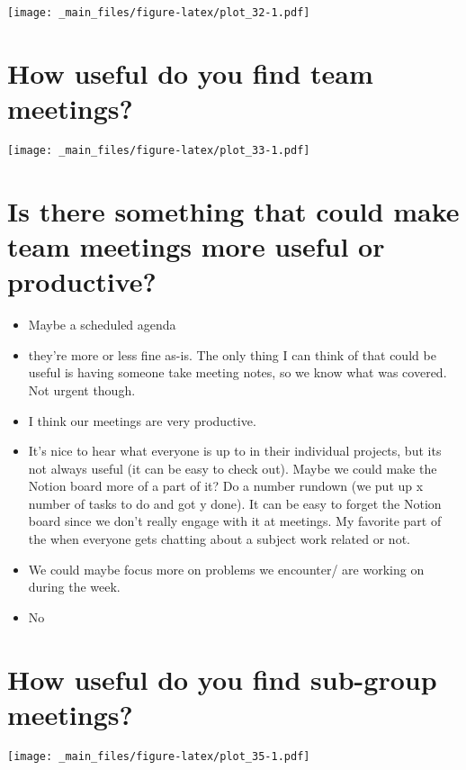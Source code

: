 \documentclass[
]{book}
\providecommand{\tightlist}{%
  \setlength{\itemsep}{0pt}\setlength{\parskip}{0pt}}
\begin{document}
\texttt{[image: \_main\_files/figure-latex/plot\_32-1.pdf]}

\hypertarget{how-useful-do-you-find-team-meetings}{%
\section{How useful do you find team meetings?}\label{how-useful-do-you-find-team-meetings}}

\texttt{[image: \_main\_files/figure-latex/plot\_33-1.pdf]}

\hypertarget{is-there-something-that-could-make-team-meetings-more-useful-or-productive}{%
\section{Is there something that could make team meetings more useful or productive?}\label{is-there-something-that-could-make-team-meetings-more-useful-or-productive}}

\begin{itemize}
\tightlist
\item
  Maybe a scheduled agenda
\item
  they're more or less fine as-is. The only thing I can think of that could be useful is having someone take meeting notes, so we know what was covered. Not urgent though.
\item
  I think our meetings are very productive.
\item
  It's nice to hear what everyone is up to in their individual projects, but its not always useful (it can be easy to check out). Maybe we could make the Notion board more of a part of it? Do a number rundown (we put up x number of tasks to do and got y done). It can be easy to forget the Notion board since we don't really engage with it at meetings. My favorite part of the when everyone gets chatting about a subject work related or not.
\item
  We could maybe focus more on problems we encounter/ are working on during the week.
\item
  No
\end{itemize}

\hypertarget{how-useful-do-you-find-sub-group-meetings}{%
\section{How useful do you find sub-group meetings?}\label{how-useful-do-you-find-sub-group-meetings}}

\texttt{[image: \_main\_files/figure-latex/plot\_35-1.pdf]}
\end{document}
